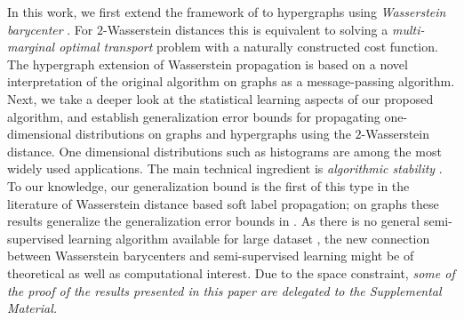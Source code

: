 \documentclass[letterpaper]{article} %
\begin{document}
In this work, we first extend the framework of \cite{Solomon:2014} to hypergraphs using \textit{Wasserstein barycenter} \cite{Wasserstein_Barycenter,Hypergraph_Asoodeh}. For $2$-Wasserstein distances this is equivalent to solving a \emph{multi-marginal optimal transport} \cite{CE2010} problem with a naturally constructed cost function. The hypergraph extension of Wasserstein propagation is based on a novel interpretation of the original algorithm on graphs \cite{Solomon:2014} as a message-passing algorithm. Next, we take a deeper look at the statistical learning aspects of our proposed algorithm, and establish generalization error bounds for propagating one-dimensional distributions on graphs and hypergraphs using the $2$-Wasserstein distance. One dimensional distributions such as histograms are among the most widely used applications. The main technical ingredient is \textit{algorithmic stability} \cite{Algorithmic_Stability}. To our knowledge, our generalization bound is the first of this type in the literature of Wasserstein distance based soft label propagation; on graphs these results generalize the generalization error bounds in \cite{Belkin2004}. As there is no general semi-supervised learning algorithm available for large dataset \cite{Label_Propa_100}, the new connection between Wasserstein barycenters and semi-supervised learning might be of theoretical as well as computational interest.  Due to the space constraint, \textit{some of the proof of the results presented in this paper are delegated to the Supplemental Material.}

\end{document}
